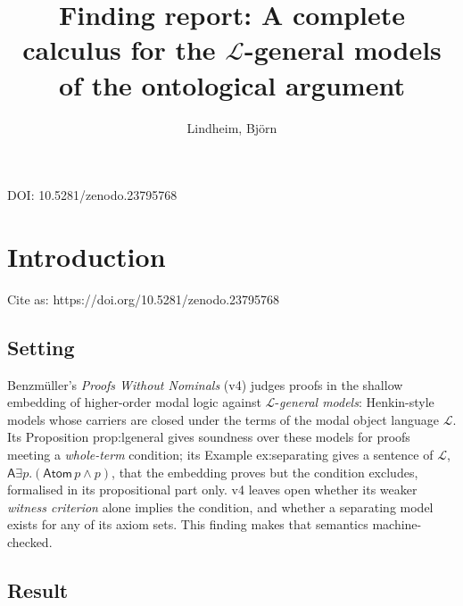 \documentclass{article}
\title{Finding report: A complete calculus for the $\mathcal{L}$-general models of the ontological argument}
\author{Lindheim, Björn}
\date{}
\begin{document}
\maketitle
\begin{center}DOI: 10.5281/zenodo.23795768\end{center}
\section{Introduction}
\label{sec:ontological-lgeneral-semantics}

Cite as: https://doi.org/10.5281/zenodo.23795768

\subsection*{Setting}

Benzmüller's \emph{Proofs Without Nominals} \cite{benzmueller2026nominals} (v4) judges proofs in the
shallow embedding of higher-order modal logic against $\mathcal L$-\emph{general models}: Henkin-style
models whose carriers are closed under the terms of the modal object language $\mathcal L$. Its
Proposition prop:lgeneral gives soundness over these models for proofs meeting a \emph{whole-term}
condition; its Example ex:separating gives a sentence of $\mathcal L$,
$\mathsf A\exists p.(\mathsf{Atom}\,p\wedge p)$, that the embedding proves but the condition
excludes, formalised in its propositional part only. v4 leaves open whether its weaker \emph{witness
criterion} alone implies the condition, and whether a separating model exists for any of its
axiom sets. This finding makes that semantics machine-checked.

\subsection*{Result}
\end{document}
